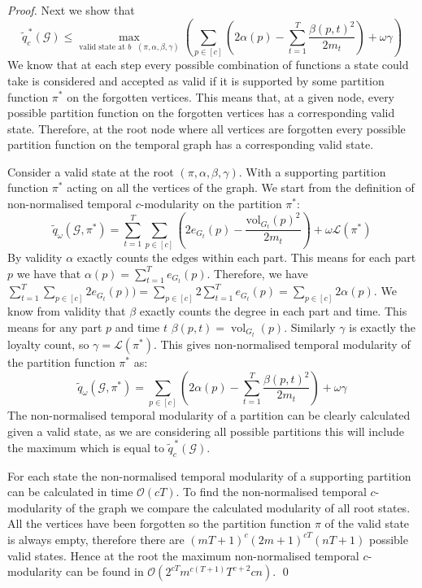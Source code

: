 \documentclass[10pt,a4paper]{amsart}
\DeclareMathOperator{\vol}{vol}
\newcommand{\cG}{\mathcal{G}}
\newcommand{\loy}{\mathcal{L}}
\begin{document}
\begin{proof}
Next we show that
\[\widetilde{q}^{\,*}_c(\cG)\leq\max_{\text{valid state at $b$ }(\pi,\alpha,\beta,\gamma)} \left(\sum_{p \in [c]} \left( 2\alpha(p) -\sum_{t=1}^T  \frac{\beta(p,t)^2}{2m_t}\right) + \omega \gamma\right)\]
We know that at each step every possible combination of functions a state could take is considered and accepted as valid if it is supported by some partition function $\pi^*$ on the forgotten vertices. This means that, at a given node, every possible partition function on the forgotten vertices has a corresponding valid state. Therefore, at the root node where all vertices are forgotten every possible partition function on the temporal graph has a corresponding valid state.

Consider a valid state at the root $(\pi,\alpha,\beta,\gamma)$.
With a supporting partition function $\pi^*$ acting on all the vertices of the graph.
We start from the definition of non-normalised temporal $c$-modularity on the partition $\pi^*$:
    \[
        \widetilde{q}_\omega(\cG,\pi^*) = \sum_{t=1}^T \sum_{p \in [c]} \left( 2e_{G_t}(p) - \frac{\text{vol}_{G_t}(p)^2}{2m_t}\right) + \omega \loy(\pi^*)
    \]
    By validity $\alpha$ exactly counts the edges within each part. This means for each part $p$ we have that $\alpha(p)=\sum_{t=1}^Te_{G_t}(p)$. Therefore, we have $\sum_{t=1}^T \sum_{p \in [c]} 2e_{G_t}(p))=\sum_{p\in[c]} 2\sum_{t=1}^T e_{G_t}(p)$$=\sum_{p \in [c]}2\alpha(p)$.
    We know from validity that $\beta$ exactly counts the degree in each part and time. This means for any part $p$ and time $t$ $\beta(p,t)=\vol_{G_t}(p)$.
    Similarly $\gamma$ is exactly the loyalty count, so $\gamma=\loy(\pi^*)$.
    This gives non-normalised temporal modularity of the partition function $\pi^*$ as:
    \[
        \widetilde{q}_\omega(\cG,\pi^*) = \sum_{p \in [c]} \left( 2\alpha(p) -\sum_{t=1}^T  \frac{\beta(p,t)^2}{2m_t}\right) + \omega \gamma
    \]
The non-normalised temporal modularity of a partition can be clearly calculated given a valid state, as we are considering all possible partitions this will include the maximum which is equal to $\widetilde{q}^{\,*}_c(\cG)$.
    
For each state the non-normalised temporal modularity of a supporting partition can be calculated in time $\mathcal{O}(cT)$.
To find the non-normalised temporal $c$-modularity of the graph we compare the calculated modularity of all root states. All the vertices have been forgotten so the partition function $\pi$ of the valid state is always empty, therefore there are $(mT+1)^c(2m+1)^{cT}(nT+1)$ possible valid states. Hence at the root the maximum non-normalised temporal $c$-modularity can be found in $\mathcal{O}(2^{cT}m^{c(T+1)}T^{c+2}cn)$.
\qed
\end{proof}
\end{document}
